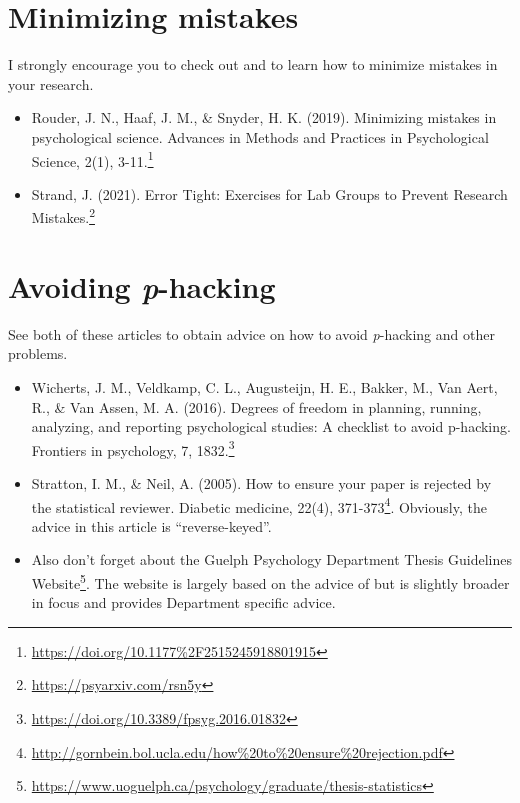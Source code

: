 \documentclass[
]{krantz}
\renewcommand{\href}[2]{#2\footnote{\url{#1}}}
\begin{document}
\hypertarget{minimizing-mistakes}{%
\section{Minimizing mistakes}\label{minimizing-mistakes}}

I strongly encourage you to check out \citep{rouder2019minimizing} and \citep{strand2021error} to learn how to minimize mistakes in your research.

\begin{itemize}
\item
  \href{https://doi.org/10.1177\%2F2515245918801915}{Rouder, J. N., Haaf, J. M., \& Snyder, H. K. (2019). Minimizing mistakes in psychological science. Advances in Methods and Practices in Psychological Science, 2(1), 3-11.}
\item
  \href{https://psyarxiv.com/rsn5y}{Strand, J. (2021). Error Tight: Exercises for Lab Groups to Prevent Research Mistakes.}
\end{itemize}

\hypertarget{avoiding-p-hacking}{%
\section{\texorpdfstring{Avoiding \emph{p}-hacking}{Avoiding p-hacking}}\label{avoiding-p-hacking}}

See both of these articles \citep{wicherts2016degrees, stratton2005ensure} to obtain advice on how to avoid \emph{p}-hacking and other problems.

\begin{itemize}
\item
  \href{https://doi.org/10.3389/fpsyg.2016.01832}{Wicherts, J. M., Veldkamp, C. L., Augusteijn, H. E., Bakker, M., Van Aert, R., \& Van Assen, M. A. (2016). Degrees of freedom in planning, running, analyzing, and reporting psychological studies: A checklist to avoid p-hacking. Frontiers in psychology, 7, 1832.}
\item
  \href{http://gornbein.bol.ucla.edu/how\%20to\%20ensure\%20rejection.pdf}{Stratton, I. M., \& Neil, A. (2005). How to ensure your paper is rejected by the statistical reviewer. Diabetic medicine, 22(4), 371-373}. Obviously, the advice in this article is ``reverse-keyed''.
\item
  Also don't forget about the \href{https://www.uoguelph.ca/psychology/graduate/thesis-statistics}{Guelph Psychology Department Thesis Guidelines Website}. The website is largely based on the advice of \citep{wicherts2016degrees} but is slightly broader in focus and provides Department specific advice.
\end{itemize}
\end{document}
